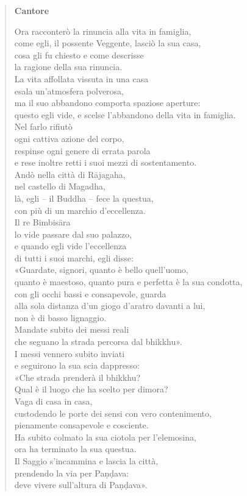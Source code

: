 \begin{quotation}
\textbf{Cantore}


Ora racconterò la rinuncia alla vita in famiglia, \\
come egli, il possente Veggente, lasciò la sua casa, \\
cosa gli fu chiesto e come descrisse \\
la ragione della sua rinuncia. \\
La vita affollata vissuta in una casa \\
esala un’atmosfera polverosa, \\
ma il suo abbandono comporta spaziose aperture: \\
questo egli vide, e scelse l’abbandono della vita in famiglia. \\
Nel farlo rifiutò \\
ogni cattiva azione del corpo, \\
respinse ogni genere di errata parola \\
e rese inoltre retti i suoi mezzi di sostentamento. \\
Andò nella città di Rājagaha, \\
nel castello di Magadha, \\
là, egli – il Buddha – fece la questua, \\
con più di un marchio d’eccellenza. \\
Il re Bimbisāra \\
lo vide passare dal suo palazzo, \\
e quando egli vide l’eccellenza \\
di tutti i suoi marchi, egli disse: \\
«Guardate, signori, quanto è bello quell’uomo, \\
quanto è maestoso, quanto pura e perfetta è la sua condotta, \\
con gli occhi bassi e consapevole, guarda \\
alla sola distanza d’un giogo d’aratro davanti a lui, \\
non è di basso lignaggio. \\
Mandate subito dei messi reali \\
che seguano la strada percorsa dal bhikkhu». \\
I messi vennero subito inviati \\
e seguirono la sua scia dappresso: \\
«Che strada prenderà il bhikkhu? \\
Qual è il luogo che ha scelto per dimora? \\
Vaga di casa in casa, \\
custodendo le porte dei sensi con vero contenimento, \\
pienamente consapevole e cosciente. \\
Ha subito colmato la sua ciotola per l’elemosina, \\
ora ha terminato la sua questua. \\
Il Saggio s’incammina e lascia la città, \\
prendendo la via per Paṇḍava: \\
deve vivere sull’altura di Paṇḍava».



\end{quotation}
